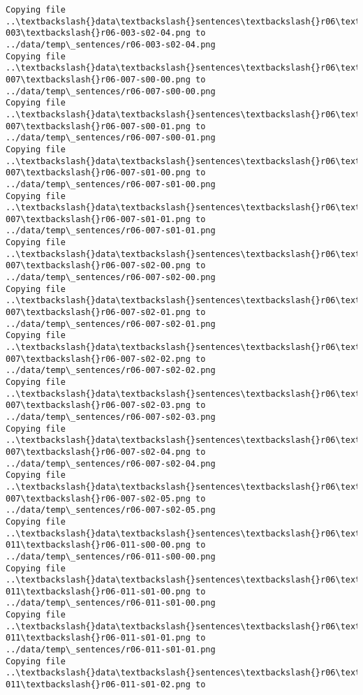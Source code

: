 \documentclass[11pt]{article}
\begin{document}
\begin{Verbatim}[commandchars=\\\{\}]
Copying file ..\textbackslash{}data\textbackslash{}sentences\textbackslash{}r06\textbackslash{}r06-003\textbackslash{}r06-003-s02-04.png to
../data/temp\_sentences/r06-003-s02-04.png
Copying file ..\textbackslash{}data\textbackslash{}sentences\textbackslash{}r06\textbackslash{}r06-007\textbackslash{}r06-007-s00-00.png to
../data/temp\_sentences/r06-007-s00-00.png
Copying file ..\textbackslash{}data\textbackslash{}sentences\textbackslash{}r06\textbackslash{}r06-007\textbackslash{}r06-007-s00-01.png to
../data/temp\_sentences/r06-007-s00-01.png
Copying file ..\textbackslash{}data\textbackslash{}sentences\textbackslash{}r06\textbackslash{}r06-007\textbackslash{}r06-007-s01-00.png to
../data/temp\_sentences/r06-007-s01-00.png
Copying file ..\textbackslash{}data\textbackslash{}sentences\textbackslash{}r06\textbackslash{}r06-007\textbackslash{}r06-007-s01-01.png to
../data/temp\_sentences/r06-007-s01-01.png
Copying file ..\textbackslash{}data\textbackslash{}sentences\textbackslash{}r06\textbackslash{}r06-007\textbackslash{}r06-007-s02-00.png to
../data/temp\_sentences/r06-007-s02-00.png
Copying file ..\textbackslash{}data\textbackslash{}sentences\textbackslash{}r06\textbackslash{}r06-007\textbackslash{}r06-007-s02-01.png to
../data/temp\_sentences/r06-007-s02-01.png
Copying file ..\textbackslash{}data\textbackslash{}sentences\textbackslash{}r06\textbackslash{}r06-007\textbackslash{}r06-007-s02-02.png to
../data/temp\_sentences/r06-007-s02-02.png
Copying file ..\textbackslash{}data\textbackslash{}sentences\textbackslash{}r06\textbackslash{}r06-007\textbackslash{}r06-007-s02-03.png to
../data/temp\_sentences/r06-007-s02-03.png
Copying file ..\textbackslash{}data\textbackslash{}sentences\textbackslash{}r06\textbackslash{}r06-007\textbackslash{}r06-007-s02-04.png to
../data/temp\_sentences/r06-007-s02-04.png
Copying file ..\textbackslash{}data\textbackslash{}sentences\textbackslash{}r06\textbackslash{}r06-007\textbackslash{}r06-007-s02-05.png to
../data/temp\_sentences/r06-007-s02-05.png
Copying file ..\textbackslash{}data\textbackslash{}sentences\textbackslash{}r06\textbackslash{}r06-011\textbackslash{}r06-011-s00-00.png to
../data/temp\_sentences/r06-011-s00-00.png
Copying file ..\textbackslash{}data\textbackslash{}sentences\textbackslash{}r06\textbackslash{}r06-011\textbackslash{}r06-011-s01-00.png to
../data/temp\_sentences/r06-011-s01-00.png
Copying file ..\textbackslash{}data\textbackslash{}sentences\textbackslash{}r06\textbackslash{}r06-011\textbackslash{}r06-011-s01-01.png to
../data/temp\_sentences/r06-011-s01-01.png
Copying file ..\textbackslash{}data\textbackslash{}sentences\textbackslash{}r06\textbackslash{}r06-011\textbackslash{}r06-011-s01-02.png to

\end{Verbatim}
\end{document}
